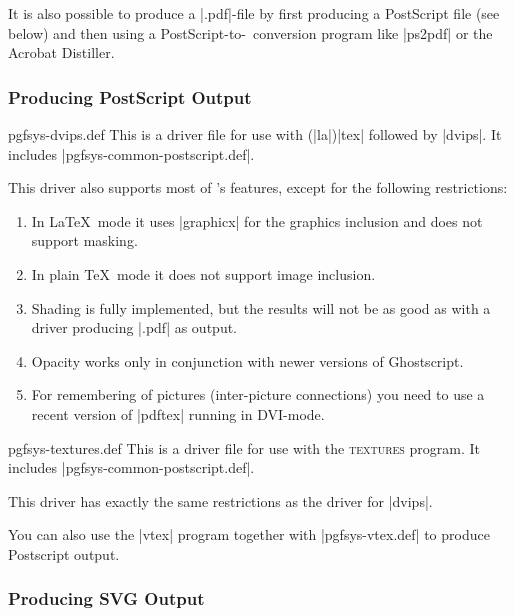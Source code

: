 It is also possible to produce a |.pdf|-file by first producing a
PostScript file (see below) and then using a PostScript-to-\pdf\
conversion program like |ps2pdf| or the Acrobat Distiller.


\subsubsection{Producing PostScript Output}

\begin{filedescription}{pgfsys-dvips.def}
  This is a driver file for use with (|la|)|tex| followed by
  |dvips|. It includes |pgfsys-common-postscript.def|.

  This driver also supports most of \pgfname's features, except for
  the following restrictions:
  \begin{enumerate}
  \item
    In \LaTeX\ mode it uses |graphicx| for the graphics
    inclusion and does not support masking.
  \item
    In plain \TeX\ mode it does not support image inclusion.
  \item
    Shading is fully implemented, but the results will not be
    as good as with a driver producing |.pdf| as output.
  \item
    Opacity works only in conjunction with newer versions of
    Ghostscript.
  \item
    For remembering of pictures (inter-picture connections) you need
    to use a recent version of |pdftex| running in DVI-mode.
  \end{enumerate}
\end{filedescription}

\begin{filedescription}{pgfsys-textures.def}
  This is a driver file for use with the \textsc{textures} program. It
  includes |pgfsys-common-postscript.def|.

  This driver has exactly the same restrictions as the driver for
  |dvips|.
\end{filedescription}

You can also use the |vtex| program together with |pgfsys-vtex.def| to
produce Postscript output.



\subsubsection{Producing SVG Output}

